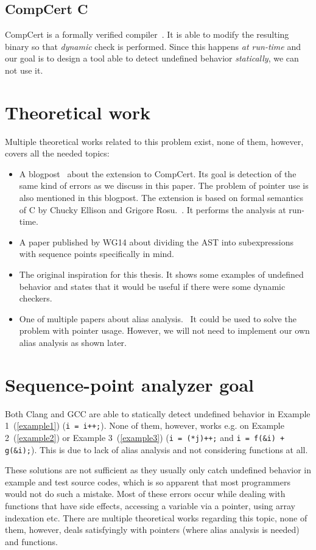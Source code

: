 \subsection{CompCert C}
CompCert is a formally verified compiler~\cite{CompCert}. It is able to modify the resulting binary so that \emph{dynamic} check is performed. Since this happens \emph{at run-time} and our goal is to design a tool able to detect undefined behavior \emph{statically}, we can not use it.
\section{Theoretical work}
Multiple theoretical works related to this problem exist, none of them, however, covers all the needed topics:
\begin{itemize}
\item A blogpost~\cite{CompCertBlogpost} about the extension to CompCert. Its goal is detection of the same kind of errors as we discuss in this paper. The problem of pointer use is also mentioned in this blogpost. The extension is based on formal semantics of C by Chucky Ellison and Grigore Rosu.~\cite{formalSemantics}. It performs the analysis at run-time.
\item A paper published by WG14 about dividing the AST into subexpressions with sequence points specifically in mind.~\cite{seqPointWG14}
\item The original inspiration for this thesis. It shows some examples of undefined behavior and states that it would be useful if there were some dynamic checkers.~\cite{regehr}
\item One of multiple papers about alias analysis.~\cite{steensgaard} It could be used to solve the problem with pointer usage. However, we will not need to implement our own alias analysis as shown later.
\end{itemize}
\section{Sequence-point analyzer goal}
Both Clang and GCC are able to statically detect undefined behavior in Example 1~(\ref{example1}) (\verb|i = i++;|). None of them, however, works e.g. on Example 2~(\ref{example2}) or Example 3~(\ref{example3}) (\verb|i = (*j)++;| and \verb|i = f(&i) + g(&i);|). This is due to lack of alias analysis and not considering functions at all.

These solutions are not sufficient as they usually only catch undefined behavior in example and test source codes, which is so apparent that most programmers would not do such a mistake. Most of these errors occur while dealing with functions that have side effects, accessing a variable via a pointer, using array indexation etc.
There are multiple theoretical works regarding this topic, none of them, however, deals satisfyingly with pointers (where alias analysis is needed)~\cite{aliasAnalysis} and functions.

